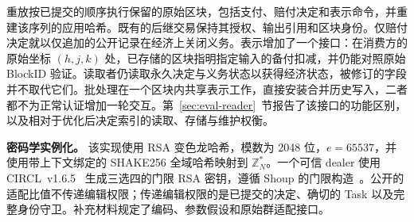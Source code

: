重放按已提交的顺序执行保留的原始区块，包括支付、赔付决定和表示命令，并重建该序列的应用哈希。既有的后继交易保持其授权、输出引用和区块身份。仅赔付决定就以仅追加的公开记录在经济上关闭义务。表示增加了一个接口：在消费方的原始坐标 $(h,j,k)$ 处，已存储的区块指明指定输入的备付扣减，并仍能对照原始 BlockID 验证。读取者仍读取永久决定与义务状态以获得经济状态，被修订的字段并不取代它们。批处理在一个区块内共享表示工作，直接安装合并历史写入，二者都不为正常认证增加一轮交互。第~\ref{sec:eval-reader}~节报告了该接口的功能区别，以及相对于优化后决定索引的读取、存储与维护权衡。

\noindent\textbf{密码学实例化。}
该实现使用 RSA 变色龙哈希，模数为 2048 位，$e=65537$，并使用带上下文绑定的 SHAKE256 全域哈希映射到 $\mathbb Z_N^*$。一个可信 dealer 使用 CIRCL~v1.6.5~\cite{circl} 生成三选四的门限 RSA 密钥，遵循 Shoup 的门限构造~\cite{shoup}。公开的适配比值不传递编辑权限；传递编辑权限的是已提交的决定、确切的 Task 以及完整身份守卫。补充材料规定了编码、参数假设和原始群适配接口。
